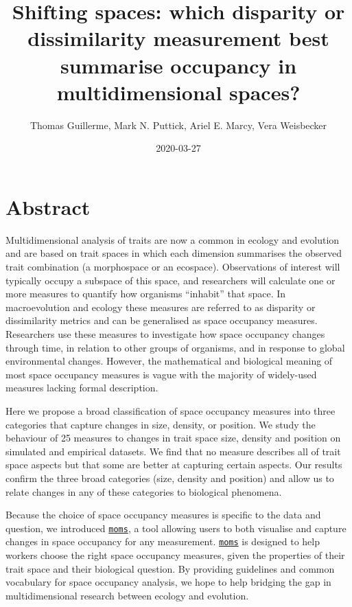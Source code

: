 \documentclass[]{article}
\title{Shifting spaces: which disparity or dissimilarity measurement best
summarise occupancy in multidimensional spaces?}
\author{Thomas Guillerme, Mark N. Puttick, Ariel E. Marcy, Vera Weisbecker}
\date{2020-03-27}
\begin{document}
\modulolinenumbers[1]
\linenumbers

\maketitle

\section{Abstract}\label{abstract}

Multidimensional analysis of traits are now a common in ecology and
evolution and are based on trait spaces in which each dimension
summarises the observed trait combination (a morphospace or an
ecospace). Observations of interest will typically occupy a subspace of
this space, and researchers will calculate one or more measures to
quantify how organisms ``inhabit'' that space. In macroevolution and
ecology these measures are referred to as disparity or dissimilarity
metrics and can be generalised as space occupancy measures. Researchers
use these measures to investigate how space occupancy changes through
time, in relation to other groups of organisms, and in response to
global environmental changes. However, the mathematical and biological
meaning of most space occupancy measures is vague with the majority of
widely-used measures lacking formal description.

Here we propose a broad classification of space occupancy measures into
three categories that capture changes in size, density, or position. We
study the behaviour of 25 measures to changes in trait space size,
density and position on simulated and empirical datasets. We find that
no measure describes all of trait space aspects but that some are better
at capturing certain aspects. Our results confirm the three broad
categories (size, density and position) and allow us to relate changes
in any of these categories to biological phenomena.

Because the choice of space occupancy measures is specific to the data
and question, we introduced
\href{https://tguillerme.shinyapps.io/moms/}{\texttt{moms}}, a tool
allowing users to both visualise and capture changes in space occupancy
for any measurement.
\href{https://tguillerme.shinyapps.io/moms/}{\texttt{moms}} is designed
to help workers choose the right space occupancy measures, given the
properties of their trait space and their biological question. By
providing guidelines and common vocabulary for space occupancy analysis,
we hope to help bridging the gap in multidimensional research between
ecology and evolution.
\end{document}
